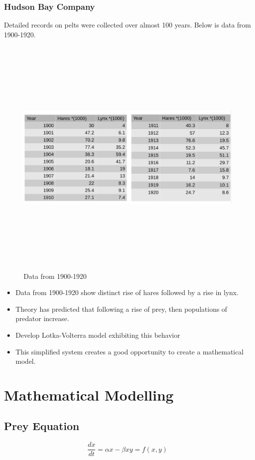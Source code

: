 \documentclass[12pt]{article}
\begin{document}
\subsubsection*{Hudson Bay Company}
Detailed records on pelts were collected over almost 100 years. Below is data from 1900-1920.\cite{noauthor_untitled_nodate} \cite{noauthor_mathematical_nodate}
\begin{figure}[h] 
    \centering
    \includegraphics[width=15cm,height=12cm]{ss_tab.jpg}
\caption{Data from 1900-1920}
\end{figure}
\begin{itemize}
    \item Data from 1900-1920 show distinct rise of hares followed by a rise in lynx.
    \item Theory has predicted that following a rise of prey, then populations of predator increase.
    \item Develop Lotka-Volterra model exhibiting this behavior
    \item  This simplified system creates a good opportunity to create a mathematical model.
\end{itemize}
\section*{Mathematical Modelling}
\subsection*{Prey Equation}
\begin{equation*}
     \frac { d x } { d t } = \alpha x - \beta x y = f(x,y)
\end{equation*}
\end{document}

